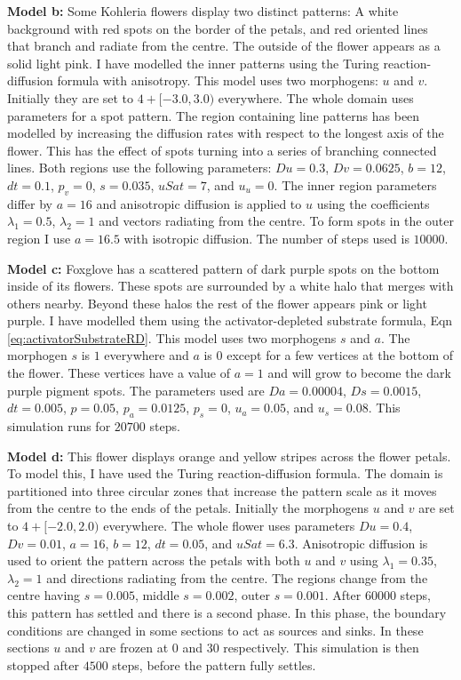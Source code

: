 \textbf{Model b:}
Some Kohleria flowers display two distinct patterns: A white background with red spots on the border of the petals, and red oriented lines that branch and radiate from the centre. The outside of the flower appears as a solid light pink. I have modelled the inner patterns using the Turing reaction-diffusion formula with anisotropy. This model uses two morphogens: $u$ and $v$. Initially they are set to $4 + [-3.0, 3.0)$ everywhere. The whole domain uses parameters for a spot pattern. The region containing line patterns has been modelled by increasing the diffusion rates with respect to the longest axis of the flower. This has the effect of spots turning into a series of branching connected lines. Both regions use the following parameters: $Du=0.3$, $Dv=0.0625$, $b=12$, $dt=0.1$, $p_v=0$, $s=0.035$, $uSat=7$, and $u_u=0$. The inner region parameters differ by $a=16$ and anisotropic diffusion is applied to $u$ using the coefficients $\lambda_{1}=0.5$, $\lambda_{2}=1$ and vectors radiating from the centre. To form spots in the outer region I use $a=16.5$ with isotropic diffusion. The number of steps used is $10000$.

\textbf{Model c:}
Foxglove has a scattered pattern of dark purple spots on the bottom inside of its flowers. These spots are surrounded by a white halo that merges with others nearby. Beyond these halos the rest of the flower appears pink or light purple. I have modelled them using the activator-depleted substrate formula, Eqn \ref{eq:activatorSubstrateRD}. This model uses two morphogens $s$ and $a$. The morphogen $s$ is $1$ everywhere and $a$ is $0$ except for a few vertices at the bottom of the flower. These vertices have a value of $a=1$ and will grow to become the dark purple pigment spots. The parameters used are $Da=0.00004$, $Ds=0.0015$, $dt=0.005$, $p=0.05$, $p_a=0.0125$, $p_s=0$, $u_a=0.05$, and $u_s=0.08$. This simulation runs for $20700$ steps.

\textbf{Model d:}
This flower displays orange and yellow stripes across the flower petals. To model this, I have used the Turing reaction-diffusion formula. The domain is partitioned into three circular zones that increase the pattern scale as it moves from the centre to the ends of the petals. Initially the morphogens $u$ and $v$ are set to $4 + [-2.0, 2.0)$ everywhere. The whole flower uses parameters $Du=0.4$, $Dv=0.01$, $a=16$, $b=12$, $dt=0.05$, and $uSat=6.3$. Anisotropic diffusion is used to orient the pattern across the petals with both $u$ and $v$ using $\lambda_1=0.35$, $\lambda_2=1$ and directions radiating from the centre. The regions change from the centre having $s=0.005$, middle $s=0.002$, outer $s=0.001$. After $60000$ steps, this pattern has settled and there is a second phase. In this phase, the boundary conditions are changed in some sections to act as sources and sinks. In these sections $u$ and $v$ are frozen at $0$ and $30$ respectively. This simulation is then stopped after $4500$ steps, before the pattern fully settles.

